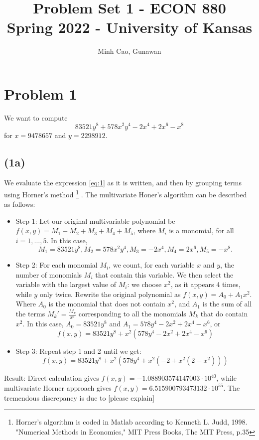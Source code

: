 \documentclass[11pt]{article}
\title{Problem Set 1 - ECON 880\\
	\small Spring 2022 - University of Kansas}
\author{Minh Cao, Gunawan}
\newcommand{\1}{\mathbbm{1}}
\newcounter{daggerfootnote}
\newcommand*{\daggerfootnote}[1]{%
	\setcounter{daggerfootnote}{\value{footnote}}%
	\renewcommand*{\thefootnote}{\fnsymbol{footnote}}%
	\footnote[2]{#1}%
	\setcounter{footnote}{\value{daggerfootnote}}%
	\renewcommand*{\thefootnote}{\arabic{footnote}}%
}
\begin{document}
\maketitle	
\section*{Problem 1}
We want to compute
\begin{equation}\label{eq:1}
	83521y^8 +578x^2 y^4 -2x^4 +2x^6 -x^8
\end{equation}
for $x = 9478657$ and $y = 2298912$.
\subsection*{(1a)}
We evaluate the expression \eqref{eq:1} as it is written, and then by grouping terms using Horner's method\daggerfootnote{Horner's algorithm is coded in Matlab according to Kenneth L. Judd, 1998. "Numerical Methods in Economics," MIT Press Books, The MIT Press, p.35}. The multivariate Honer's algorithm can be described as follows:\\
\begin{itemize}
\item Step 1: Let our original multivariable polynomial be $f(x,y) = M_{1} +M_{2}+M_{3}+M_{4}+M_{5}$, where $M_{i}$ is a monomial, for all $i=1,\ldots,5$. In this case, 
\[M_{1} = 83521y^{8}, M_{2} = 578x^{2}y^{4}, M_{3}= -2x^{4}, M_{4}=2x^{6}, M_{5} = -x^{8}.\]
\item Step 2: For each monomial $M_{i}$, we count, for each variable $x$ and $y$, the number of monomials $M_{i}$ that contain this variable. We then select the variable with the largest value of $M_{i}$: we choose $x^2$, as it appears 4 times, while $y$ only twice. Rewrite the original polynomial as $f(x,y) = A_{0}+A_{1}x^2$. Where $A_{0}$ is the monomial that does not contain $x^2$, and $A_{1}$ is the sum of all the terms ${M_{k}}' = \frac{M_{k}}{x^2} $ corresponding to all the monomials $M_{k}$ that do contain $x^2$. In this case, $A_{0} = 83521y^8$ and $A_{1} = 578y^{4} - 2x^2+2x^{4}-x^{6}$, or
\[f(x,y) = 83521y^8 +x^2(578y^{4} - 2x^{2}+2x^{4}-x^{6}) \]

\item Step 3: Repeat step 1 and 2 until we get:
\[f(x,y) = 83521y^8 +x^{2} (578y^{4} +x^{2}(-2+x^{2}(2-x^2)))\]
\end{itemize}

Result: Direct calculation gives $f(x,y) = -1.088903574147003\cdot 10^{40}$, while multivariate Horner approach gives $f(x,y) = 6.515900793473132\cdot 10^{55}$. The tremendous discrepancy is due to [please explain] 
\end{document}
